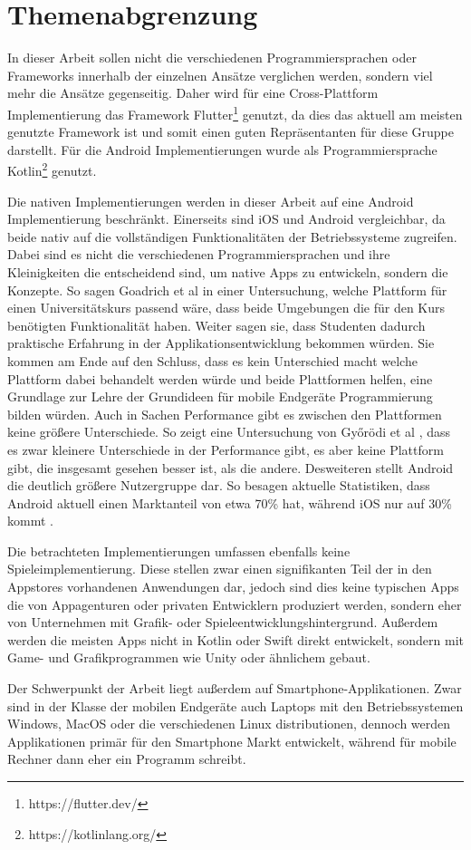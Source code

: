 \section{Themenabgrenzung}
In dieser Arbeit sollen nicht die verschiedenen Programmiersprachen oder Frameworks innerhalb der einzelnen Ansätze verglichen werden, sondern viel mehr die Ansätze gegenseitig. Daher wird für eine Cross-Plattform Implementierung das Framework Flutter\footnote{https://flutter.dev/} genutzt, da dies das aktuell am meisten genutzte Framework\cite{statist_CP_Framework} ist und somit einen guten Repräsentanten für diese Gruppe darstellt. Für die Android Implementierungen wurde als Programmiersprache Kotlin\footnote{https://kotlinlang.org/} genutzt. 

Die nativen Implementierungen werden in dieser Arbeit auf eine Android Implementierung beschränkt. 
Einerseits sind iOS und Android vergleichbar, da beide nativ auf die vollständigen Funktionalitäten der Betriebssysteme zugreifen.
Dabei sind es nicht die verschiedenen Programmiersprachen und ihre Kleinigkeiten die entscheidend sind, um native Apps zu entwickeln, sondern die Konzepte.
So sagen Goadrich et al \cite{iOSvsAndroid} in einer Untersuchung, welche Plattform für einen Universitätskurs passend wäre, dass beide Umgebungen die für den Kurs benötigten Funktionalität haben.
Weiter sagen sie, dass Studenten dadurch praktische Erfahrung in der Applikationsentwicklung bekommen würden. Sie kommen am Ende auf den Schluss, dass es kein Unterschied macht welche Plattform dabei behandelt werden würde und beide Plattformen helfen, eine Grundlage zur Lehre der Grundideen für mobile Endgeräte Programmierung bilden würden.
Auch in Sachen Performance gibt es zwischen den Plattformen keine größere Unterschiede. So zeigt eine Untersuchung von Győrödi et al \cite{Android_IOS_Performance_comparison}, dass es zwar kleinere Unterschiede in der Performance gibt, es aber keine Plattform gibt, die insgesamt gesehen besser ist, als die andere.
Desweiteren stellt Android die deutlich größere Nutzergruppe dar. So besagen aktuelle Statistiken, dass Android aktuell einen Marktanteil von etwa 70\% hat, während iOS nur auf 30\% kommt \cite{statist_OS_worldwide}.  

Die betrachteten Implementierungen umfassen ebenfalls keine Spieleimplementierung. Diese stellen zwar einen signifikanten Teil der in den Appstores vorhandenen Anwendungen dar, jedoch sind dies keine typischen Apps die von Appagenturen oder privaten Entwicklern produziert werden, sondern eher von Unternehmen mit Grafik- oder Spieleentwicklungshintergrund. Außerdem werden die meisten Apps nicht in Kotlin oder Swift direkt entwickelt, sondern mit Game- und Grafikprogrammen wie Unity oder ähnlichem gebaut. 



Der Schwerpunkt der Arbeit liegt außerdem auf Smartphone-Applikationen. Zwar sind in der Klasse der mobilen Endgeräte auch Laptops mit den Betriebssystemen Windows, MacOS oder die verschiedenen Linux distributionen, dennoch werden Applikationen primär für den Smartphone Markt entwickelt, während für mobile Rechner dann eher ein Programm schreibt.
